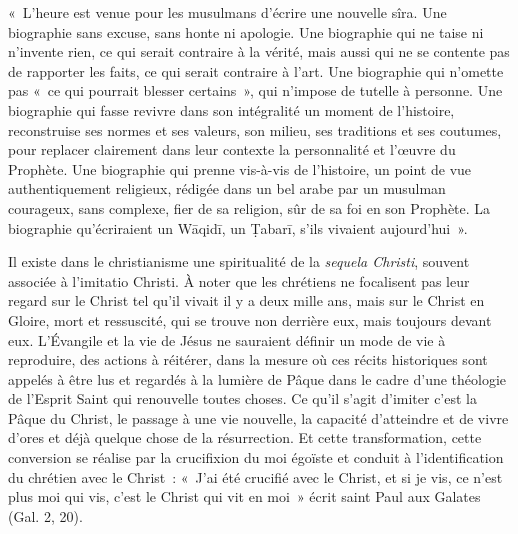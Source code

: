 «~L'heure est venue pour les musulmans d'écrire une nouvelle sîra. Une
biographie sans excuse, sans honte ni apologie. Une biographie qui ne
taise ni n'invente rien, ce qui serait contraire à la vérité, mais aussi
qui ne se contente pas de rapporter les faits, ce qui serait contraire à
l'art. Une biographie qui n'omette pas «~ce qui pourrait blesser
certains~», qui n'impose de tutelle à personne. Une biographie qui fasse
revivre dans son intégralité un moment de l'histoire, reconstruise ses
normes et ses valeurs, son milieu, ses traditions et ses coutumes, pour
replacer clairement dans leur contexte la personnalité et l'œuvre du
Prophète. Une biographie qui prenne vis-à-vis de l'histoire, un point de
vue authentiquement religieux, rédigée dans un bel arabe par un musulman
courageux, sans complexe, fier de sa religion, sûr de sa foi en son
Prophète. La biographie qu'écriraient un Wāqidī, un Ṭabarī, s'ils
vivaient aujourd'hui~».


Il existe dans le christianisme une spiritualité de la \emph{sequela
Christi}, souvent associée à l'imitatio Christi. À noter que les
chrétiens ne focalisent pas leur regard sur le Christ tel qu'il vivait
il y a deux mille ans, mais sur le Christ en Gloire, mort et ressuscité,
qui se trouve non derrière eux, mais toujours devant eux. L'Évangile et
la vie de Jésus ne sauraient définir un mode de vie à reproduire, des
actions à réitérer, dans la mesure où ces récits historiques sont
appelés à être lus et regardés à la lumière de Pâque dans le cadre d'une
théologie de l'Esprit Saint qui renouvelle toutes choses. Ce qu'il
s'agit d'imiter c'est la Pâque du Christ, le passage à une vie nouvelle,
la capacité d'atteindre et de vivre d'ores et déjà quelque chose de la
résurrection. Et cette transformation, cette conversion se réalise par
la crucifixion du moi égoïste et conduit à l'identification du chrétien
avec le Christ~: «~J'ai été crucifié avec le Christ, et si je vis, ce
n'est plus moi qui vis, c'est le Christ qui vit en moi~» écrit saint
Paul aux Galates (Gal. 2, 20).

